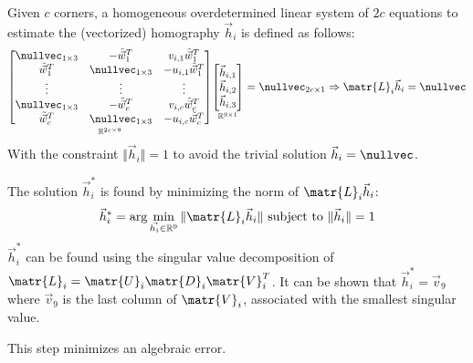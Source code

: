 \begin{description}
        Given $c$ corners, a homogeneous overdetermined linear system of $2c$ equations to estimate the (vectorized) homography $\vec{h}_i$ is defined as follows:
        \[
            \underset{\mathbb{R}^{2c \times 9}}{
                \begin{bmatrix}
                    \nullvec_{1 \times 3} & -\tilde{\vec{w}}_1^T & v_{i,1} \tilde{\vec{w}}_1^T \\
                    \tilde{\vec{w}}_1^T & \nullvec_{1 \times 3} & -u_{i,1} \tilde{\vec{w}}_1^T \\
                    \vdots & \vdots & \vdots \\
                    \nullvec_{1 \times 3} & -\tilde{\vec{w}}_c^T & v_{i,c} \tilde{\vec{w}}_c^T \\
                    \tilde{\vec{w}}_c^T & \nullvec_{1 \times 3} & -u_{i,c} \tilde{\vec{w}}_c^T \\
                \end{bmatrix}
            }
            \underset{\mathbb{R}^{9 \times 1}}{
                \begin{bmatrix}
                    \vec{h}_{i, 1} \\ \vec{h}_{i, 2} \\ \vec{h}_{i, 3}
                \end{bmatrix}
            }
            =
            \nullvec_{2c \times 1}
            \Rightarrow
            \matr{L}_i \vec{h}_i = \nullvec
        \]
        With the constraint $\Vert \vec{h}_i \Vert = 1$ to avoid the trivial solution $\vec{h}_i = \nullvec$.

        The solution $\vec{h}_i^*$ is found by minimizing the norm of $\matr{L}_i \vec{h}_i$:
        \[
            \vec{h}_i^* = \arg\min_{\vec{h_i} \in \mathbb{R}^{9}} \Vert \matr{L}_i \vec{h}_i \Vert \text{ subject to } \Vert \vec{h}_i \Vert = 1
        \]
        $\vec{h}_i^*$ can be found using the singular value decomposition of $\matr{L}_i = \matr{U}_i \matr{D}_i \matr{V}_i^T$.
        It can be shown that $\vec{h}_i^* = \vec{v}_9$ where $\vec{v}_9$ is the last column of $\matr{V}_i$, associated with the smallest singular value.

        \begin{remark}
            This step minimizes an algebraic error.
        \end{remark}


\end{description}
